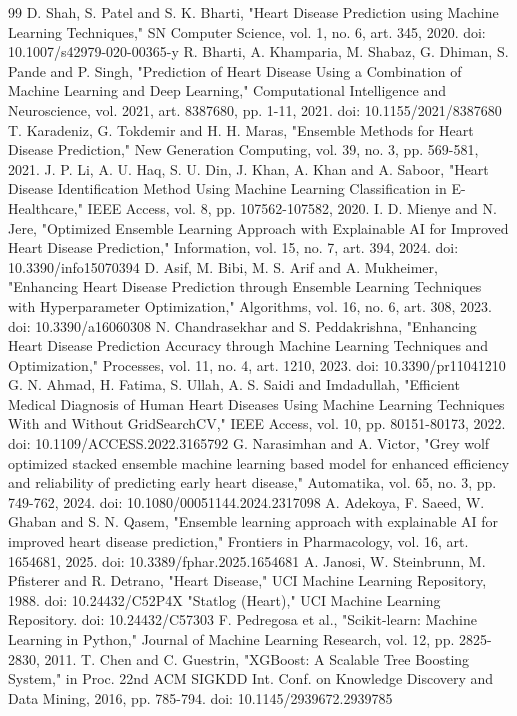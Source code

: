 \documentclass[runningheads]{llncs}
\begin{document}
\begin{thebibliography}{99}
 D. Shah, S. Patel and S. K. Bharti, "Heart Disease Prediction using Machine Learning Techniques," SN Computer Science, vol. 1, no. 6, art. 345, 2020. doi: 10.1007/s42979-020-00365-y
 R. Bharti, A. Khamparia, M. Shabaz, G. Dhiman, S. Pande and P. Singh, "Prediction of Heart Disease Using a Combination of Machine Learning and Deep Learning," Computational Intelligence and Neuroscience, vol. 2021, art. 8387680, pp. 1-11, 2021. doi: 10.1155/2021/8387680
 T. Karadeniz, G. Tokdemir and H. H. Maras, "Ensemble Methods for Heart Disease Prediction," New Generation Computing, vol. 39, no. 3, pp. 569-581, 2021.
 J. P. Li, A. U. Haq, S. U. Din, J. Khan, A. Khan and A. Saboor, "Heart Disease Identification Method Using Machine Learning Classification in E-Healthcare," IEEE Access, vol. 8, pp. 107562-107582, 2020.
 I. D. Mienye and N. Jere, "Optimized Ensemble Learning Approach with Explainable AI for Improved Heart Disease Prediction," Information, vol. 15, no. 7, art. 394, 2024. doi: 10.3390/info15070394
 D. Asif, M. Bibi, M. S. Arif and A. Mukheimer, "Enhancing Heart Disease Prediction through Ensemble Learning Techniques with Hyperparameter Optimization," Algorithms, vol. 16, no. 6, art. 308, 2023. doi: 10.3390/a16060308
 N. Chandrasekhar and S. Peddakrishna, "Enhancing Heart Disease Prediction Accuracy through Machine Learning Techniques and Optimization," Processes, vol. 11, no. 4, art. 1210, 2023. doi: 10.3390/pr11041210
 G. N. Ahmad, H. Fatima, S. Ullah, A. S. Saidi and Imdadullah, "Efficient Medical Diagnosis of Human Heart Diseases Using Machine Learning Techniques With and Without GridSearchCV," IEEE Access, vol. 10, pp. 80151-80173, 2022. doi: 10.1109/ACCESS.2022.3165792
 G. Narasimhan and A. Victor, "Grey wolf optimized stacked ensemble machine learning based model for enhanced efficiency and reliability of predicting early heart disease," Automatika, vol. 65, no. 3, pp. 749-762, 2024. doi: 10.1080/00051144.2024.2317098
 A. Adekoya, F. Saeed, W. Ghaban and S. N. Qasem, "Ensemble learning approach with explainable AI for improved heart disease prediction," Frontiers in Pharmacology, vol. 16, art. 1654681, 2025. doi: 10.3389/fphar.2025.1654681
 A. Janosi, W. Steinbrunn, M. Pfisterer and R. Detrano, "Heart Disease," UCI Machine Learning Repository, 1988. doi: 10.24432/C52P4X
 "Statlog (Heart)," UCI Machine Learning Repository. doi: 10.24432/C57303
 F. Pedregosa et al., "Scikit-learn: Machine Learning in Python," Journal of Machine Learning Research, vol. 12, pp. 2825-2830, 2011.
 T. Chen and C. Guestrin, "XGBoost: A Scalable Tree Boosting System," in Proc. 22nd ACM SIGKDD Int. Conf. on Knowledge Discovery and Data Mining, 2016, pp. 785-794. doi: 10.1145/2939672.2939785
\end{thebibliography}
\end{document}
